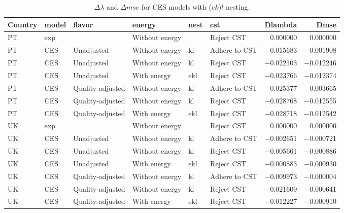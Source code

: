 \documentclass[preprint,authoryear,12pt]{elsarticle}\usepackage[]{graphicx}\usepackage[]{color}
\begin{document}
%
\begin{table}[ht]
\centering
\caption{$\Delta \lambda$ and $\Delta mse$ for CES models with ($ek$)$l$ nesting.} 
\label{tab:DSRmse_CESekl}
{\tiny
\begin{tabular}{llllllrr}
  \hline
Country & model & flavor & energy & nest & cst & Dlambda & Dmse \\ 
  \hline
PT & exp &  & Without energy &  & Reject CST & 0.000000 & 0.000000 \\ 
  PT & CES & Unadjusted & Without energy & kl & Adhere to CST & $-$0.015683 & $-$0.001908 \\ 
  PT & CES & Unadjusted & Without energy & kl & Reject CST & $-$0.022103 & $-$0.012246 \\ 
  PT & CES & Unadjusted & With energy & ekl & Reject CST & $-$0.023766 & $-$0.012374 \\ 
  PT & CES & Quality-adjusted & Without energy & kl & Adhere to CST & $-$0.025377 & $-$0.003665 \\ 
  PT & CES & Quality-adjusted & Without energy & kl & Reject CST & $-$0.028768 & $-$0.012555 \\ 
  PT & CES & Quality-adjusted & With energy & ekl & Reject CST & $-$0.028718 & $-$0.012542 \\ 
  UK & exp &  & Without energy &  & Reject CST & 0.000000 & 0.000000 \\ 
  UK & CES & Unadjusted & Without energy & kl & Adhere to CST & $-$0.002651 & $-$0.000721 \\ 
  UK & CES & Unadjusted & Without energy & kl & Reject CST & $-$0.005661 & $-$0.000886 \\ 
  UK & CES & Unadjusted & With energy & ekl & Reject CST & $-$0.000883 & $-$0.000930 \\ 
  UK & CES & Quality-adjusted & Without energy & kl & Adhere to CST & $-$0.009973 & $-$0.000004 \\ 
  UK & CES & Quality-adjusted & Without energy & kl & Reject CST & $-$0.021609 & $-$0.000641 \\ 
  UK & CES & Quality-adjusted & With energy & ekl & Reject CST & $-$0.012227 & $-$0.000910 \\ 
   \hline
\end{tabular}
}
\end{table}
\end{document}
